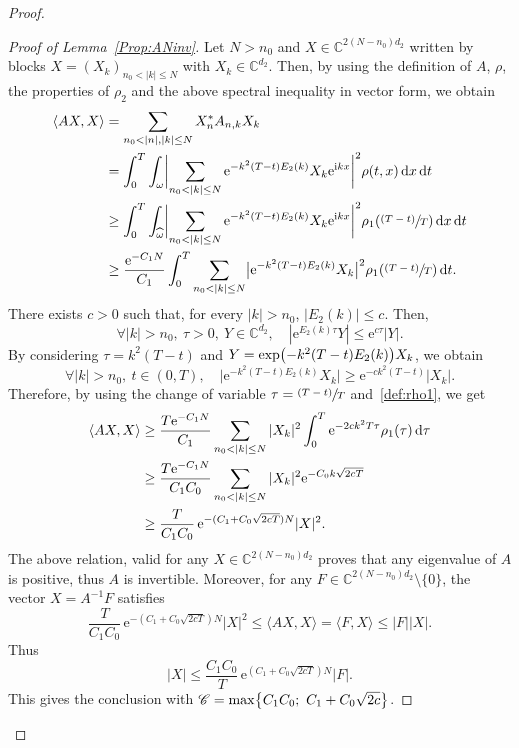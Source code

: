 \documentclass[10pt]{amsart}
\let\mathcal\mathscr
\newcommand{\psfrac}[2]{\sfrac{(#1)}{#2}}
\theoremstyle{plain}
\theoremstyle{definition}
\theoremstyle{remark}
\newcommand{\diff}[1][-3]{\ensuremath{\mathop{}\mkern#1mu\mathrm{d}}}
\newcommand{\set}{\mathbb}
\renewcommand{\C}{\set{C}}
\newcommand{\eu}{\mathrm e}
\newcommand{\iu}{\mathrm i}
\let\originalleft\left
\let\originalright\right
\renewcommand{\left}{\mathopen{}\mathclose\bgroup\originalleft}
\renewcommand{\right}{\aftergroup\egroup\originalright}
\begin{document}
\begin{proof}
\begin{proof}[Proof of Lemma~\ref{Prop:ANinv}]
Let $N>n_0$ and $X \in \C^{2(N-n_0)d_2}$ written by blocks $X=(X_k)_{n_0<|k|\leq N}$ with $X_k \in \C^{d_2}$. Then, by using the definition of $A$, $\rho$, the properties of $\rho_2$ and the above spectral inequality in vector form, we obtain
\begin{align*}
\langle AX,X\rangle
& = \sum_{n_0 < |n|,|k|\leq N} X_n^* A_{n,k} X_k \\
& = \int_0^T \int_{\omega} \biggl| \sum_{n_0 < |k|\leq N}
\eu^{-k^2(T-t)E_2(k)} X_k \eu^{\iu kx} \biggr|^2 \rho(t,x) \diff x \diff t
\\ & \geq
\int_0^T \int_{\widehat{\omega}} \biggl| \sum_{n_0 < |k|\leq N}
\eu^{-k^2(T-t)E_2(k)} X_k \eu^{\iu kx} \biggr|^2 \rho_1\left(\psfrac{T-t}{T} \right) \diff x \diff t
\\ & \geq \frac{\eu^{-C_1 N}}{C_1} \int_0^T \sum_{n_0 < |k|\leq N} \bigl| \eu^{-k^2(T-t)E_2(k)} X_k \bigr|^2 \rho_1 \left(\psfrac{T-t}{T} \right) \diff t.
\end{align*}
There exists $c>0$ such that, for every $|k|>n_0$, $|E_2(k)| \leq c$. Then,
\[
\forall |k| >n_0,\ \tau>0,\ Y\in\C^{d_2},\quad | \eu^{E_2(k)\tau}Y| \leq \eu^{c \tau} |Y|.
\]
By considering $\tau=k^2(T-t)$ and $Y=\exp \left(-k^2(T-t)E_2(k)\right) X_k$, we obtain
\[
\forall |k| >n_0,\ t \in (0,T), \quad
\big| \eu^{-k^2(T-t)E_2(k)} X_k \big| \geq \eu^{-ck^2(T-t)} |X_k|.
\]
Therefore, by using the change of variable $\tau=\psfrac{T-t}{T}$ and~\eqref{def:rho1}, we get
\begin{align*}
\langle AX,X\rangle
& \geq
\frac{T \eu^{-C_1 N}}{C_1} \sum_{n_0 < |k|\leq N} | X_k |^2 \int_0^T \eu^{-2ck^2T \tau} \rho_1 \left(\tau \right) \diff \tau
\\ & \geq
\frac{T \eu^{-C_1 N}}{C_1 C_0} \sum_{n_0 < |k|\leq N} | X_k |^2 \eu^{-C_0 k\sqrt{2cT}}
\\ & \geq
\frac{T}{C_1 C_0}\, \eu^{- (C_1+C_0 \sqrt{2cT})N} | X |^2.
\end{align*}
The above relation, valid for any $X\in\C^{2(N-n_0)d_2}$ proves that any eigenvalue of $A$ is positive, thus $A$ is invertible.
Moreover, for any $F \in \C^{2(N-n_0)d_2} \setminus \{0\}$, the vector $X=A^{-1}F$ satisfies
\[
\frac{T}{C_1 C_0}\, \eu^{- (C_1+C_0 \sqrt{2cT})N} | X |^2
\leq \langle AX, X \rangle = \langle F, X \rangle \leq |F| |X|.
\]
Thus
\[
|X| \leq \frac{C_1 C_0}{T}\, \eu^{ (C_1+C_0 \sqrt{2cT})N} |F|.
\]
This gives the conclusion with
$\mathcal{C}=\max\left\{ C_1 C_0 ;\ C_1+C_0 \sqrt{2c} \right\}$.
\end{proof}


\end{proof}
\end{document}
